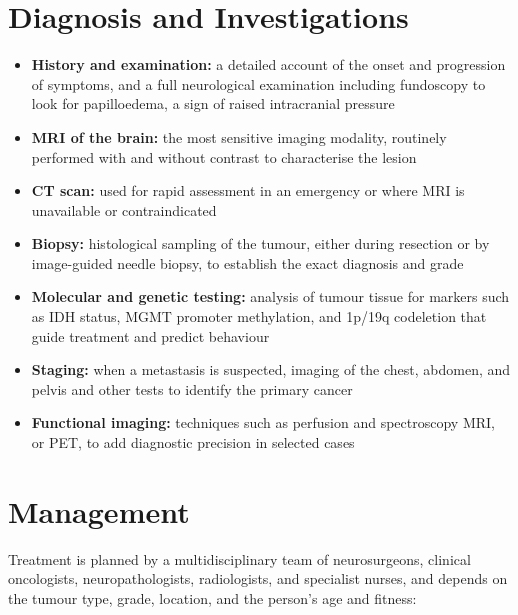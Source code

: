 \section*{Diagnosis and Investigations}
\begin{itemize}
    \item \textbf{History and examination:} a detailed account of the onset and progression of symptoms, and a full neurological examination including fundoscopy to look for papilloedema, a sign of raised intracranial pressure
    \item \textbf{MRI of the brain:} the most sensitive imaging modality, routinely performed with and without contrast to characterise the lesion
    \item \textbf{CT scan:} used for rapid assessment in an emergency or where MRI is unavailable or contraindicated
    \item \textbf{Biopsy:} histological sampling of the tumour, either during resection or by image-guided needle biopsy, to establish the exact diagnosis and grade
    \item \textbf{Molecular and genetic testing:} analysis of tumour tissue for markers such as IDH status, MGMT promoter methylation, and 1p/19q codeletion that guide treatment and predict behaviour
    \item \textbf{Staging:} when a metastasis is suspected, imaging of the chest, abdomen, and pelvis and other tests to identify the primary cancer
    \item \textbf{Functional imaging:} techniques such as perfusion and spectroscopy MRI, or PET, to add diagnostic precision in selected cases
\end{itemize}

\section*{Management}
Treatment is planned by a multidisciplinary team of neurosurgeons, clinical oncologists, neuropathologists, radiologists, and specialist nurses, and depends on the tumour type, grade, location, and the person's age and fitness:

